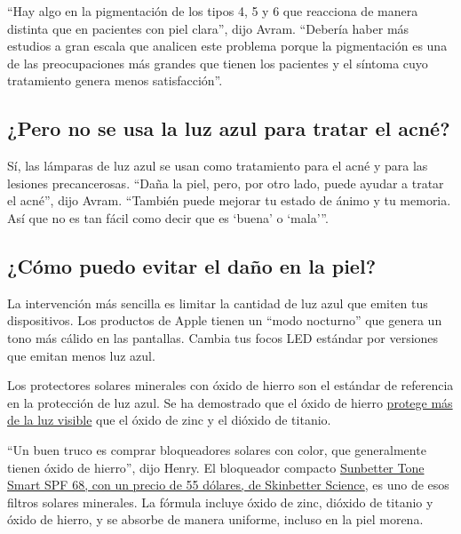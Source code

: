 ``Hay algo en la pigmentación de los tipos 4, 5 y 6 que reacciona de
manera distinta que en pacientes con piel clara'', dijo Avram. ``Debería
haber más estudios a gran escala que analicen este problema porque la
pigmentación es una de las preocupaciones más grandes que tienen los
pacientes y el síntoma cuyo tratamiento genera menos satisfacción''.

\hypertarget{pero-no-se-usa-la-luz-azul-para-tratar-el-acnuxe9}{%
\subsection{¿Pero no se usa la luz azul para tratar el
acné?}\label{pero-no-se-usa-la-luz-azul-para-tratar-el-acnuxe9}}

Sí, las lámparas de luz azul se usan como tratamiento para el acné y
para las lesiones precancerosas. ``Daña la piel, pero, por otro lado,
puede ayudar a tratar el acné'', dijo Avram. ``También puede mejorar tu
estado de ánimo y tu memoria. Así que no es tan fácil como decir que es
`buena' o `mala'''.

\hypertarget{cuxf3mo-puedo-evitar-el-dauxf1o-en-la-piel}{%
\subsection{¿Cómo puedo evitar el daño en la
piel?}\label{cuxf3mo-puedo-evitar-el-dauxf1o-en-la-piel}}

La intervención más sencilla es limitar la cantidad de luz azul que
emiten tus dispositivos. Los productos de Apple tienen un ``modo
nocturno'' que genera un tono más cálido en las pantallas. Cambia tus
focos LED estándar por versiones que emitan menos luz azul.

Los protectores solares minerales con óxido de hierro son el estándar de
referencia en la protección de luz azul. Se ha demostrado que el óxido
de hierro
\href{https://www.ncbi.nlm.nih.gov/pmc/articles/PMC6718061/}{protege más
de la luz visible} que el óxido de zinc y el dióxido de titanio.

``Un buen truco es comprar bloqueadores solares con color, que
generalmente tienen óxido de hierro'', dijo Henry. El bloqueador
compacto
\href{https://skinbetter.com/products/sunbetter-tone-smart-spf-68-sunscreen-compact/}{Sunbetter
Tone Smart SPF 68, con un precio de 55 dólares, de Skinbetter Science},
es uno de esos filtros solares minerales. La fórmula incluye óxido de
zinc, dióxido de titanio y óxido de hierro, y se absorbe de manera
uniforme, incluso en la piel morena.

